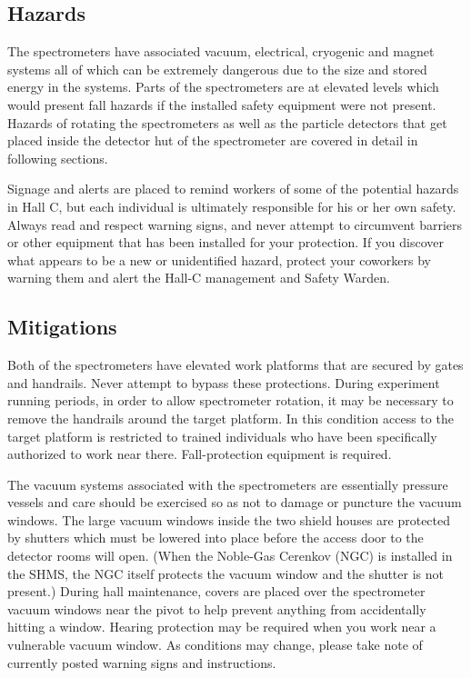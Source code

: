 \begin{safetyen}{0}{0}
\label{sec:spectrometer-safety}

\subsection{Hazards}

The spectrometers have associated vacuum, electrical, cryogenic and
magnet systems all of which can be extremely dangerous due to the size
and stored energy in the systems.  
Parts of the spectrometers are at elevated levels which would present fall
hazards if the installed safety equipment were not present.
Hazards of rotating the
spectrometers as well as the particle detectors that get placed inside
the detector hut of the spectrometer are covered in detail in
following sections.

Signage and alerts are placed to remind workers of some of the potential hazards
in Hall C, but each individual is ultimately responsible for his or her own 
safety. Always read and respect warning signs, and never attempt to 
circumvent barriers or other equipment
that has been installed for your protection. If you discover what appears to be a
new or unidentified hazard, protect your coworkers by warning them
and alert the Hall-C management and Safety Warden.

\subsection{Mitigations}

Both of the spectrometers have elevated work platforms that are secured by
gates and handrails. Never attempt to bypass these protections. During experiment
running periods, in order to allow spectrometer rotation, it may be necessary to
remove the handrails around the target platform. In this condition access to the 
target platform is restricted to trained individuals who have been specifically
authorized to work near there. Fall-protection equipment is required.

The vacuum systems associated with the spectrometers are essentially 
pressure vessels and care should be exercised so as not to damage or puncture the 
vacuum windows.   The large vacuum windows inside the two shield houses are protected
by shutters which must be lowered into place before the access door to the
detector rooms will open. (When the Noble-Gas Cerenkov (NGC) is installed in the SHMS, 
the NGC itself protects the vacuum window and the shutter is not present.)
During hall maintenance, covers are placed over the spectrometer
vacuum windows near the pivot to help prevent anything from accidentally hitting 
a window. Hearing protection may be required when you work near a vulnerable
vacuum window. As conditions may change, please take note of currently posted
warning signs and instructions.


\end{safetyen}

